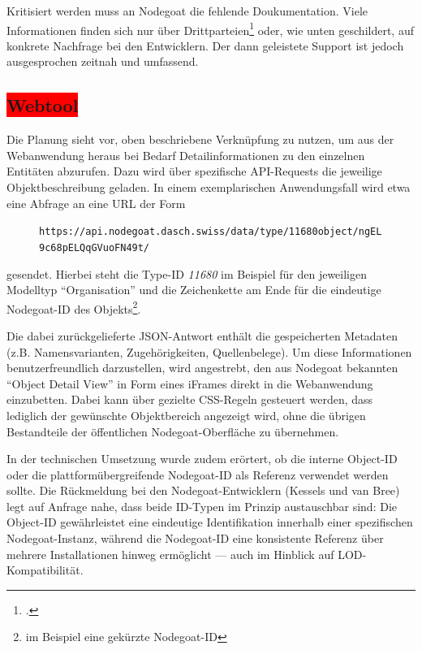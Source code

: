 \documentclass[12pt, a4paper, ngerman, bidi=default]{article}
\let\cite\footcite
\newcommand{\code}[1]{\colorbox{VeryLightGray}{\texttt{#1}}} %
\begin{document}
Kritisiert werden muss an Nodegoat die fehlende Doukumentation. Viele Informationen finden sich nur über Drittparteien\cite[beispielsweise durch Schulungsunterlagen von Universitäten, 
hier besonders:\\][]{gubler_nodegoat_nodate} oder, wie unten geschildert, auf konkrete Nachfrage bei den Entwicklern. Der dann geleistete Support 
ist jedoch ausgesprochen zeitnah und umfassend. 



\subsection{\colorbox{red}{Webtool}}\label{subsec:webtool_chapter}
Die Planung sieht vor, oben beschriebene Verknüpfung zu nutzen, um aus der Webanwendung heraus bei Bedarf Detailinformationen zu den einzelnen Entitäten abzurufen. 
Dazu wird über spezifische API-Requests die jeweilige Objektbeschreibung geladen. In einem exemplarischen Anwendungsfall wird etwa eine Abfrage an eine URL der Form
\begin{figure}
  \hspace*{-0.6cm}%
  \centering\code{https://api.nodegoat.dasch.swiss/data/type/\colorbox{MediumGray}{11680}object/ngEL9c68pELQqGVuoFN49t/}
\end{figure}
gesendet. Hierbei steht die Type-ID \textit{11680} im Beispiel für den jeweiligen Modelltyp \enquote{Organisation} und die Zeichenkette am Ende für die eindeutige Nodegoat-ID 
des Objekts\footnote{im Beispiel eine gekürzte Nodegoat-ID}.

Die dabei zurückgelieferte JSON-Antwort enthält die gespeicherten Metadaten (z.B. Namensvarianten, Zugehörigkeiten, Quellenbelege). Um diese Informationen benutzerfreundlich darzustellen, 
wird angestrebt, den aus Nodegoat bekannten \enquote{Object Detail View} in Form eines iFrames direkt in die Webanwendung einzubetten. Dabei kann über gezielte CSS-Regeln gesteuert werden, dass 
lediglich der gewünschte Objektbereich angezeigt wird, ohne die übrigen Bestandteile der öffentlichen Nodegoat-Oberfläche zu übernehmen.

In der technischen Umsetzung wurde zudem erörtert, ob die interne Object-ID oder die plattformübergreifende Nodegoat-ID als Referenz verwendet werden sollte. Die Rückmeldung bei den
Nodegoat-Entwicklern (Kessels und van Bree) legt auf Anfrage nahe, dass beide ID-Typen im Prinzip austauschbar sind: Die Object-ID gewährleistet eine eindeutige Identifikation 
innerhalb einer spezifischen Nodegoat-Instanz, 
während die Nodegoat-ID eine konsistente Referenz über mehrere Installationen hinweg ermöglicht — auch im Hinblick auf LOD-Kompatibilität.
\end{document}
